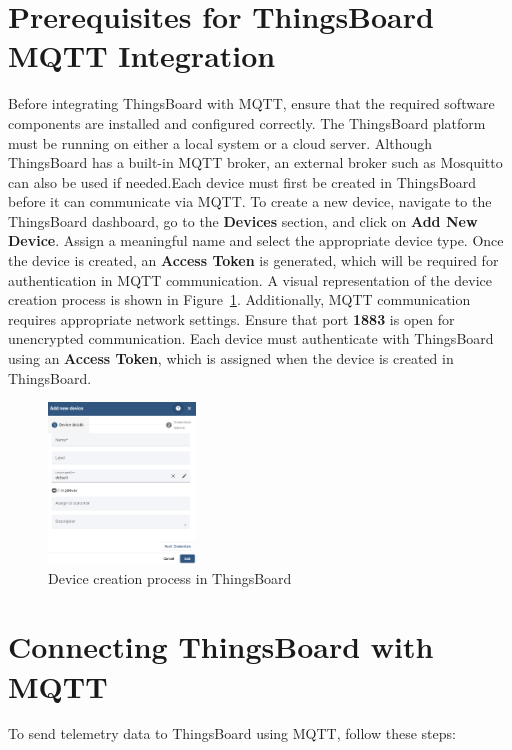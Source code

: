 \documentclass[a4paper,12pt]{report}
\begin{document}
 \section{Prerequisites for ThingsBoard MQTT Integration}

 Before integrating ThingsBoard with MQTT, ensure that the required software components are installed and configured correctly. The ThingsBoard platform must be running on either a local system or a cloud server. Although ThingsBoard has a built-in MQTT broker, an external broker such as Mosquitto can also be used if needed.Each device must first be created in ThingsBoard before it can communicate via MQTT. To create a new device, navigate to the ThingsBoard dashboard, go to the \textbf{Devices} section, and click on \textbf{Add New Device}. Assign a meaningful name and select the appropriate device type. Once the device is created, an \textbf{Access Token} is generated, which will be required for authentication in MQTT communication. A visual representation of the device creation process is shown in Figure~\ref{fig:device_creation}. Additionally, MQTT communication requires appropriate network settings. Ensure that port \textbf{1883} is open for unencrypted communication. Each device must authenticate with ThingsBoard using an \textbf{Access Token}, which is assigned when the device is created in ThingsBoard.
 
 \begin{figure}[H]
    \centering
    \includegraphics[width=0.35\textwidth]{device creation.PNG}
    \caption{Device creation process in ThingsBoard}
    \label{fig:device_creation}
 \end{figure}

 
 \section{Connecting ThingsBoard with MQTT}
 
 To send telemetry data to ThingsBoard using MQTT, follow these steps:
 
\end{document}
